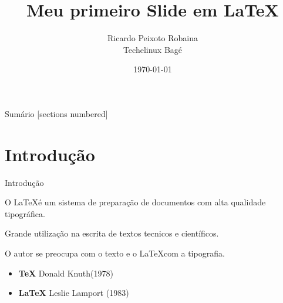 \documentclass{beamer}
\title{Meu primeiro Slide em \LaTeX}
\date{\today}
\author{Ricardo Peixoto Robaina \\ Techelinux Bagé}
\institute{Universidade Federal do Pampa}
\begin{document}
	
	\begin{frame}[noframenumbering]
		\titlepage
		\thispagestyle{empty}
	\end{frame}
	
	\begin{frame}{Sumário}
		[sections numbered]
		\tableofcontents[hideallsubsections]
	\end{frame}

\section{Introdução}
\begin{frame}{Introdução}
	
	
	O \LaTeX é um sistema de preparação de documentos com alta qualidade tipográfica.

	
	Grande utilização na escrita de textos tecnicos e científicos.
	
	
	O autor se preocupa com o texto e o \LaTeX com a tipografia.
	
	\pause
	
	\begin{itemize}
		\item \textbf{TeX} Donald Knuth(1978)  
		\item \textbf{\LaTeX} Leslie Lamport (1983)
	\end{itemize}

\end{frame}
\end{document}

